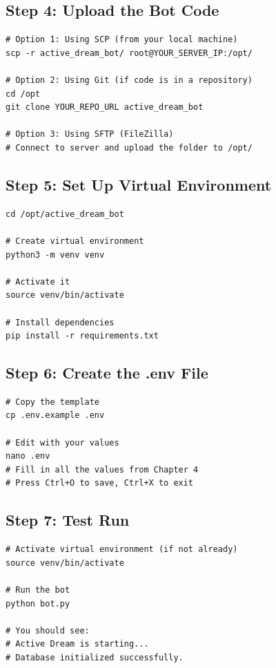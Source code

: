 \subsection{Step 4: Upload the Bot Code}

\begin{lstlisting}[style=bashstyle, title=Upload Code to Server]
# Option 1: Using SCP (from your local machine)
scp -r active_dream_bot/ root@YOUR_SERVER_IP:/opt/

# Option 2: Using Git (if code is in a repository)
cd /opt
git clone YOUR_REPO_URL active_dream_bot

# Option 3: Using SFTP (FileZilla)
# Connect to server and upload the folder to /opt/
\end{lstlisting}

\subsection{Step 5: Set Up Virtual Environment}

\begin{lstlisting}[style=bashstyle, title=Virtual Environment Setup]
cd /opt/active_dream_bot

# Create virtual environment
python3 -m venv venv

# Activate it
source venv/bin/activate

# Install dependencies
pip install -r requirements.txt
\end{lstlisting}

\subsection{Step 6: Create the .env File}

\begin{lstlisting}[style=bashstyle, title=Create Configuration]
# Copy the template
cp .env.example .env

# Edit with your values
nano .env
# Fill in all the values from Chapter 4
# Press Ctrl+O to save, Ctrl+X to exit
\end{lstlisting}

\subsection{Step 7: Test Run}

\begin{lstlisting}[style=bashstyle, title=Test the Bot]
# Activate virtual environment (if not already)
source venv/bin/activate

# Run the bot
python bot.py

# You should see:
# Active Dream is starting...
# Database initialized successfully.
\end{lstlisting}

